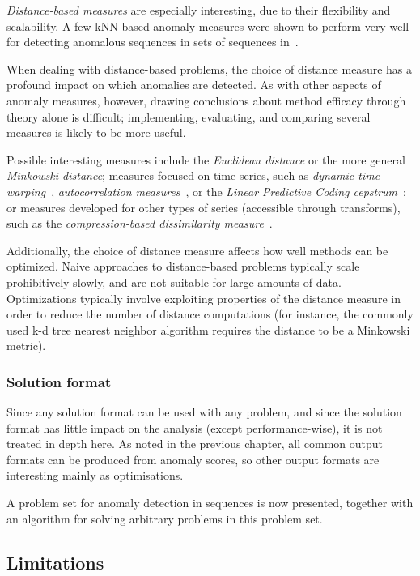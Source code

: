 \emph{Distance-based measures} are especially interesting, due to their flexibility and scalability. A few kNN-based anomaly measures were shown to perform very well for detecting anomalous sequences in sets of sequences in~\cite{chandola3}.

When dealing with distance-based problems, the choice of distance measure has a profound impact on which anomalies are detected. As with other aspects of anomaly measures, however, drawing conclusions about method efficacy through theory alone is difficult; implementing, evaluating, and comparing several measures is likely to be more useful.

Possible interesting measures include the \emph{Euclidean distance} or the more general \emph{Minkowski distance}; measures focused on time series, such as \emph{dynamic time warping}~\cite{dtw}, \emph{autocorrelation measures}~\cite{autocorrelation}, or the \emph{Linear Predictive Coding cepstrum}~\cite{cepstrum}; or measures developed for other types of series (accessible through transforms), such as the \emph{compression-based dissimilarity measure}~\cite{keogh2}.

Additionally, the choice of distance measure affects how well methods can be optimized. Naive approaches to distance-based problems typically scale prohibitively slowly, and are not suitable for large amounts of data. Optimizations typically involve exploiting properties of the distance measure in order to reduce the number of distance computations (for instance, the commonly used k-d tree nearest neighbor algorithm requires the distance to be a Minkowski metric).

\subsubsection{Solution format}

Since any solution format can be used with any problem, and since the solution format has little impact on the analysis (except performance-wise), it is not treated in depth here. As noted in the previous chapter, all common output formats can be produced from anomaly scores, so other output formats are interesting mainly as optimisations.

A problem set for anomaly detection in sequences is now presented, together with an algorithm for solving arbitrary problems in this problem set.

\subsection{Limitations}

